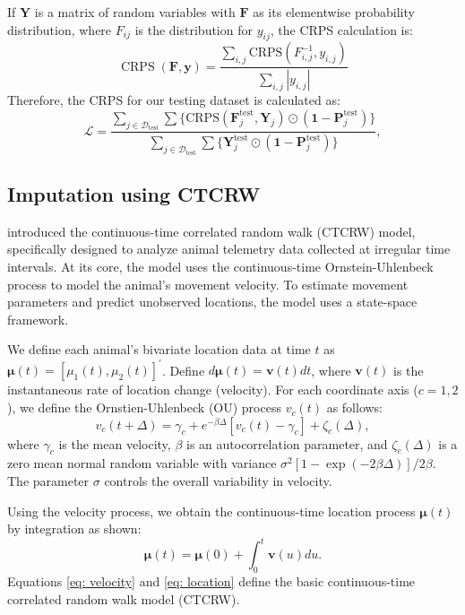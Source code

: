 \documentclass[11pt]{article}
\begin{document}
If $\bm{Y}$ is a matrix of random variables with $\bm{F}$ as its elementwise probability distribution, where $F_{ij}$ is the distribution for $y_{ij}$, the CRPS calculation is: \begin{equation}
    \operatorname{CRPS}\left(\bm{F}, \bm{y}\right) = \frac{\sum_{i,j}\mathrm{CRPS}(F^{-1}_{i,j},y_{i,j})}{\sum_{i,j}|y_{i,j}|}
\end{equation}
Therefore, the CRPS for our testing dataset is calculated as: \begin{equation}
    \mathcal{L}=\frac{\sum_{j\in \mathcal{D}_{\mathrm{test}}}\sum \big\{\mathrm{CRPS}(\bm{F}^{\mathrm{test}}_j,\bm{Y}_j)\odot (\bm{1}-\bm{P}_j^{\mathrm{test}})\big\}}{\sum_{j\in \mathcal{D}_{\mathrm{test}}}\sum\{\bm{Y}_j^{\mathrm{test}}\odot (\bm{1}-\bm{P}_j^{\mathrm{test}})\}},
\end{equation}



\subsection{Imputation using CTCRW}\label{sec: imputation using ctcrw}

\citet{johnson2008continuous} introduced the continuous-time correlated random walk (CTCRW) model, specifically designed to analyze animal telemetry data collected at irregular time intervals. At its core, the model uses the continuous-time Ornstein-Uhlenbeck process to model the animal's movement velocity. To estimate movement parameters and predict unobserved locations, the model uses a state-space framework. 

We define each animal's bivariate location data at time $t$ as $\bm{\mu}(t)=[\mu_1(t), \mu_2(t)]^{\prime}$. Define $d\bm{\mu}(t)=\bm{v}(t)dt$, where $\bm{v}(t)$ is the instantaneous rate of location change (velocity). For each coordinate axis ($c=1, 2$), we define the Ornstien-Uhlenbeck (OU) process $v_c(t)$ as follows:
\begin{equation}\label{eq: velocity}
    v_c(t+\Delta)=\gamma_c+e^{-\beta\Delta}[v_c(t)-\gamma_c]+\zeta_c(\Delta),
\end{equation}
where $\gamma_c$ is the mean velocity, $\beta$ is an autocorrelation parameter, and $\zeta_c(\Delta)$ is a zero mean normal random variable with variance $\sigma^2[1-\exp(-2\beta\Delta)]/2\beta$. The parameter $\sigma$ controls the overall variability in velocity.

Using the velocity process, we obtain the continuous-time location process $\bm{\mu}(t)$ by integration as shown:
\begin{equation}\label{eq: location}
    \bm{\mu}(t)=\bm{\mu}(0)+\int_{0}^{t}\bm{v}(u)du.
\end{equation}
Equations \ref{eq: velocity} and \ref{eq: location} define the basic continuous-time correlated random walk model (CTCRW).
\end{document}
